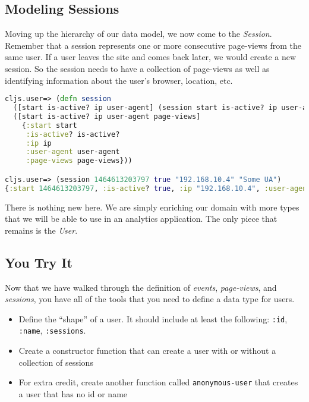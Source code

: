 \documentclass[10pt,twoside,openright]{memoir}
\begin{document}
\subsection{Modeling Sessions}

Moving up the hierarchy of our data model, we now come to the
\emph{Session}. Remember that a session represents one or more
consecutive page-views from the same user. If a user leaves the site and
comes back later, we would create a new session. So the session needs to
have a collection of page-views as well as identifying information about
the user's browser, location, etc.

\begin{lstlisting}[language=Clojure, caption={Modeling a session}]
  cljs.user=> (defn session
  ([start is-active? ip user-agent] (session start is-active? ip user-agent []))
  ([start is-active? ip user-agent page-views]
    {:start start
     :is-active? is-active?
     :ip ip
     :user-agent user-agent
     :page-views page-views}))

cljs.user=> (session 1464613203797 true "192.168.10.4" "Some UA")
{:start 1464613203797, :is-active? true, :ip "192.168.10.4", :user-agent "Some UA", :page-views []}
\end{lstlisting}

There is nothing new here. We are simply enriching our domain with more
types that we will be able to use in an analytics application. The only
piece that remains is the \emph{User}.


\subsection{You Try It}

Now that we have walked through the definition of \emph{events},
\emph{page-views}, and \emph{sessions}, you have all of the tools that
you need to define a data type for users.

\begin{itemize}
\tightlist
\item
  Define the ``shape'' of a user. It should include at least the
  following: \texttt{:id}, \texttt{:name}, \texttt{:sessions}.
\item
  Create a constructor function that can create a user with or without a
  collection of sessions
\item
  For extra credit, create another function called
  \texttt{anonymous-user} that creates a user that has no id or name
\end{itemize}
\end{document}
